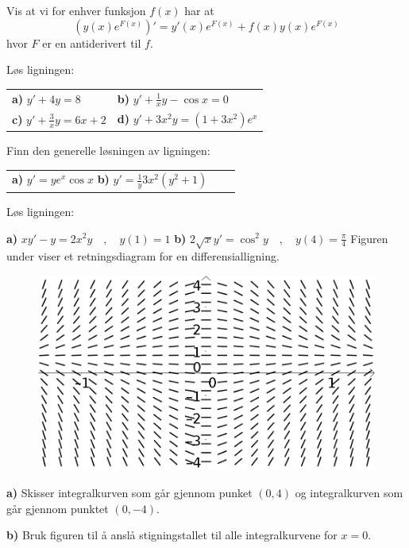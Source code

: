



\opgt

\nes
	Vis at vi for enhver funksjon $ f(x) $ har at
	\[ \left(y(x) e^{F(x)}\right)' = y'(x)e^{F(x)}+f(x)y(x)e^{F(x)} \]
	hvor $ F $ er en antiderivert til $ f $.
	
	Løs ligningen:\os
	
	\begin{tabular}{@{}l l }
		\textbf{a)} $ y'+4y=8 $	\quad
		&\textbf{b)} $\displaystyle y' + \frac{1}{x}y - \cos x=0$  \\[11 pt]
		\textbf{c)} $\displaystyle y' + \frac{3}{x}y = 6x +2 $		
		&\textbf{d)} $\displaystyle y'+3x^2 y =(1+3x^2)e^x$ 
	\end{tabular}

\nes	
{}
Finn den generelle løsningen av ligningen:\os

\begin{tabular}{@{}l l l}	
	\textbf{a)} $\displaystyle y'=ye^x \cos x$\quad	
	\textbf{b)} $\displaystyle y'=\frac{1}{y}3x^2(y^2+1) $ 	
\end{tabular}

Løs ligningen:\os

\textbf{a)} $\displaystyle xy'-y=2x^2y\quad,\quad y(1)=1$\os
\textbf{b)} $2\sqrt{x}y'=\cos^2 y\quad,\quad y(4)=\frac{\pi}{4}$ 
\newpage
\nes
{}
Figuren under viser et retningsdiagram for en differensialligning.
\begin{figure}
	\centering
	\includegraphics[scale=0.85]{retn}
\end{figure}
\textbf{a)} Skisser integralkurven som går gjennom punket $ (0, 4) $ og integralkurven som går gjennom punktet $ (0, -4) $.\os

\textbf{b)} Bruk figuren til å anslå stigningstallet til alle integralkurvene for $ x=0 $.\vsk

